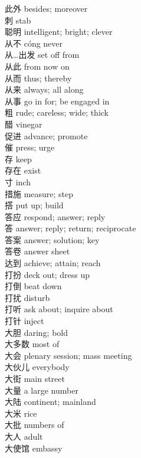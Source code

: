 此外 \quad besides; moreover\\
刺 \quad stab\\
聪明 \quad intelligent; bright; clever\\
从不 \quad cóng \quad never\\
从…出发 \quad set off from\\
从此 \quad from now on\\
从而 \quad thus; thereby\\
从来 \quad always; all along\\
从事 \quad go in for; be engaged in\\
粗 \quad rude; careless; wide; thick\\
醋 \quad vinegar\\
促进 \quad advance; promote\\
催 \quad press; urge\\
存 \quad keep\\
存在 \quad exist\\
寸 \quad inch\\
措施 \quad measure; step\\
搭 \quad put up; build\\
答应 \quad respond; answer; reply\\
答 \quad answer; reply; return; reciprocate\\
答案 \quad answer; solution; key\\
答卷 \quad answer sheet\\
达到 \quad achieve; attain; reach\\
打扮 \quad deck out; dress up\\
打倒 \quad beat down\\
打扰 \quad disturb\\
打听 \quad ask about; inquire about\\
打针 \quad inject\\
大胆 \quad daring; bold\\
大多数 \quad most of\\
大会 \quad plenary session; mass meeting\\
大伙儿 \quad everybody\\
大街 \quad main street\\
大量 \quad a large number\\
大陆 \quad continent; mainland\\
大米 \quad rice\\
大批 \quad numbers of\\
大人 \quad adult\\
大使馆 \quad embassy\\
